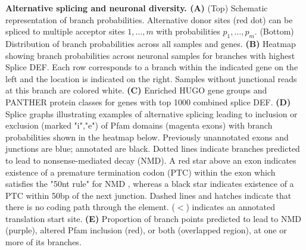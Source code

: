 \textbf{Alternative splicing and neuronal diversity. (A)} (Top) Schematic representation of branch probabilities. Alternative donor sites (red dot) can be spliced to multiple acceptor sites $1,\ldots, m$ with probabilities $p_{1},\ldots,p_{m}$. (Bottom) Distribution of branch probabilities across all samples and genes. \textbf{(B)} Heatmap showing branch probabilities across neuronal samples for branches with highest Splice DEF. Each row corresponds to a branch within the indicated gene on the left and the location is indicated on the right. Samples without junctional reads at this branch are colored white. \textbf{(C)} Enriched HUGO gene groups and PANTHER protein classes for genes with top 1000 combined splice DEF. \textbf{(D)} Splice graphs illustrating examples of alternative splicing leading to inclusion or exclusion (marked "i","e") of Pfam domains (magenta exons) with branch probabilities shown in the heatmap below. Previously unannotated exons and junctions are blue; annotated are black. Dotted lines indicate branches predicted to lead to nonsense-mediated decay (NMD). A red star above an exon indicates existence of a premature termination codon (PTC) within the exon which satisfies the "50nt rule" for NMD \citep{Nagy_1998}, whereas a black star indicates existence of a PTC within 50bp of the next junction. Dashed lines and hatches indicate that there is no coding path through the element. ($\lt$) indicates an annotated translation start site. \textbf{(E)} Proportion of branch points predicted to lead to NMD (purple), altered Pfam inclusion (red), or both (overlapped region), at one or more of its branches.
